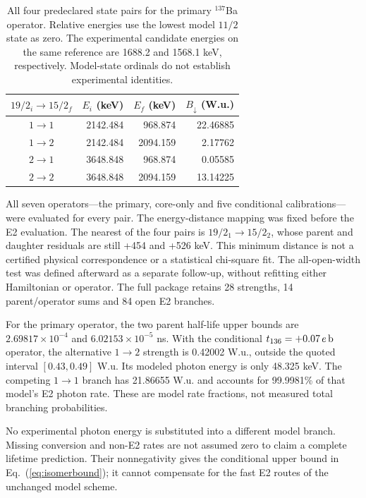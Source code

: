 \begin{table}[t]
\caption{All four predeclared state pairs for the primary $^{137}$Ba
operator. Relative energies use the lowest model $11/2$ state as
zero. The experimental candidate energies on the same reference
are 1688.2 and 1568.1 keV, respectively. Model-state ordinals
do not establish experimental identities.}\label{tab:isomerpairs}
\centering
\begin{tabular}{crrr}
\toprule
$19/2_i\to15/2_f$ & $E_i$ (keV) & $E_f$ (keV) & $B_\downarrow$ (W.u.)\\
\midrule
$1\to1$ &2142.484&968.874&22.46885\\
$1\to2$ &2142.484&2094.159&2.17762\\
$2\to1$ &3648.848&968.874&0.05585\\
$2\to2$ &3648.848&2094.159&13.14225\\
\bottomrule
\end{tabular}
\end{table}

All seven operators---the primary, core-only and five conditional
calibrations---were evaluated for every pair.
The energy-distance mapping was fixed before the E2 evaluation.
The nearest of the four pairs is $19/2_1\to15/2_2$, whose parent
and daughter residuals are still +454 and +526 keV. This minimum
distance is not a certified physical correspondence or a statistical
chi-square fit.
The all-open-width test was defined afterward as a separate
follow-up, without refitting either Hamiltonian or operator.
The full package retains 28 strengths, 14 parent/operator sums and
84 open E2 branches.

For the primary operator, the two parent half-life upper bounds
are $2.69817\times10^{-4}$ and $6.02153\times10^{-5}$ ns.
With the conditional $t_{136}=+0.07\,e\,{\rm b}$ operator,
the alternative $1\to2$ strength is 0.42002 W.u.,
outside the quoted interval $[0.43,0.49]$ W.u.
Its modeled photon energy is only 48.325 keV.
The competing $1\to1$ branch has 21.86655 W.u. and accounts for
99.9981\% of that model's E2 photon rate. These are model rate fractions,
not measured total branching probabilities.

No experimental photon energy is substituted into a different
model branch. Missing conversion and non-E2 rates are not assumed
zero to claim a complete lifetime prediction. Their nonnegativity
gives the conditional upper bound in Eq.~(\ref{eq:isomerbound});
it cannot compensate for the fast E2 routes of the unchanged model scheme.
